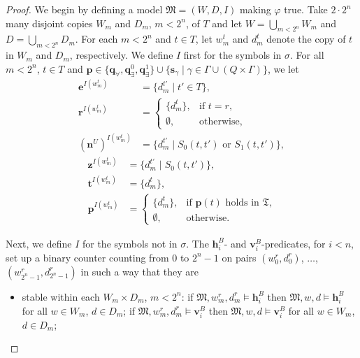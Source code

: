 \documentclass{lmcs} %
\theoremstyle{plain}\newtheorem{satz}[thm]{Satz} %
\newcommand{\diag}{\fform{e}}
\newcommand{\fform}[1]{\boldsymbol{#1}}
\newcommand{\pvar}{\fform{p}}
\newcommand{\qvar}{\fform{q}}
\newcommand{\svar}{\fform{s}}
\newcommand{\hvar}{\fform{h}}
\newcommand{\vvar}{\fform{v}}
\newcommand{\Zvar}{\fform{z}}
\newcommand{\cR}{B}
\newcommand{\cU}{U}
\newcommand{\nextU}{\fform{n}^\cU}
\newcommand{\start}{\fform{r}}
\newcommand{\tree}{\fform{t}}
\newcommand{\qA}{\qvar_\forall}
\newcommand{\qE}{\qvar_\exists}
\newcommand{\treemod}{\mathfrak T}
\newcommand{\treedom}{T}
\newcommand{\treerel}{S}
\newcommand{\treet}{t}
\begin{document}
\begin{proof}
			
		We begin by defining a model $\mathfrak M=(W,D,I)$ making $\varphi$ true.
		Take $2\cdot 2^n$ many disjoint copies $W_m$ and $D_m$, $m<2^n$, of $\treedom$ and let
		$W=\bigcup_{m<2^n}W_m$ and $D=\bigcup_{m<2^n}D_m$. For each  $m<2^n$ and $\treet\in \treedom$, let
		$w_m^\treet$ and $d_m^\treet$ denote the copy of $\treet$ in $W_m$ and $D_m$, respectively.
		We define $I$ first for the symbols in $\sigma$. For all $m<2^n$, $\treet\in\treedom$ and
		$\pvar\in\{\qA,\qE^0,\qE^1\}\cup\{\svar_\gamma\mid\gamma\in\Gamma\cup(Q\times\Gamma)\}$, we let
		\begin{align}
			\label{Ifirst}
			\diag^{I(w_m^\treet)} & = \{d_m^{\treet'} \mid \treet' \in \treedom \},\\
			\start^{I(w_m^\treet)} & = \left\{
			\begin{array}{ll}
				\{d_m^{\treet}\}, & \mbox{if $\treet=r$,}\\[3pt]
				\emptyset, &\mbox{otherwise,}
			\end{array}
			\right.\\
			(\nextU)^{I(w_m^\treet)} & = \{d_m^{\treet'} \mid  \treerel_0(\treet,\treet')\mbox{ or } \treerel_1(\treet,\treet')\},%
\end{align}
\begin{align}
			\Zvar^{I(w_m^\treet)} & = \{d_m^{\treet'} \mid  \treerel_0(\treet,\treet') \},\\
			\tree^{I(w_m^\treet)} & = \{d_m^{\treet}\},\\
			\label{Ilast}
			\pvar^{I(w_m^\treet)} & = \left\{
			\begin{array}{ll}
				\{d_m^{\treet}\}, & \mbox{if $\pvar(\treet)$ holds in $\treemod$,}\\[3pt]
				\emptyset, &\mbox{otherwise.}
			\end{array}
			\right.
		\end{align}
		
		

		
		
		Next, we define $I$ for the symbols not in $\sigma$. The $\hvar^\cR_i$- and $\vvar^\cR_i$-predicates, for $i<n$, set up a binary counter counting from $0$ to $2^n\mathop{-}1$ on pairs $(w_0^r,d_0^r)$, $\dots$, $(w_{2^n-1}^r,d_{2^n-1}^r)$ in such a way
		that they are 
		\begin{itemize}
			\item[--]
			stable within each $W_m\times D_m$, $m<2^n$: 
			if $\mathfrak M,w_m^r,d_m^r\models\hvar^\cR_i$ then
			$\mathfrak M,w,d\models\hvar^\cR_i$ for all $w\in W_m$, $d\in D_m$;
			if $\mathfrak M,w_m^r,d_m^r\models\vvar^\cR_i$ then
			$\mathfrak M,w,d\models\vvar^\cR_i$ for all $w\in W_m$, $d\in D_m$;
			

\end{itemize}
\end{proof}
\end{document}

